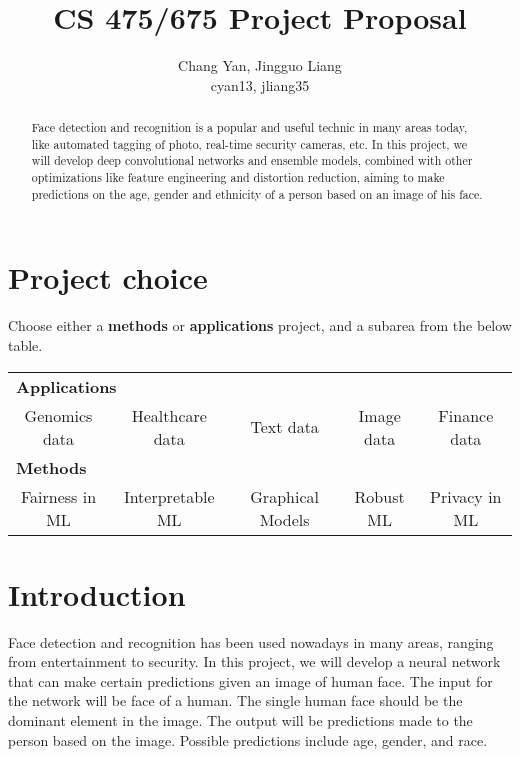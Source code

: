 \documentclass{article}
\title{CS 475/675 Project Proposal}
\author{
  Chang Yan, Jingguo Liang\\
  cyan13, jliang35
}
\newcommand{\Checked}{{\LARGE \XBox}}%
\newcommand{\Unchecked}{{\LARGE \Square}}%
\begin{document}
\maketitle

\begin{abstract}
Face detection and recognition is a popular and useful technic in many areas today, like automated tagging of photo, real-time security cameras, etc. In this project, we will develop deep convolutional networks and ensemble models, combined with other optimizations like feature engineering and distortion reduction, aiming to make predictions on the age, gender and ethnicity of a person based on an image of his face. 
\end{abstract}

\section{Project choice}

Choose either a {\bf methods} or {\bf applications} project, and a subarea from the below table.
\begin{table}[!h]
\centering
\def\arraystretch{2}
\begin{tabular}{c c c c c }
\toprule
\multicolumn{5}{l}{\Checked \bf Applications} \\
\Unchecked Genomics data & 
\Unchecked Healthcare data & 
\Unchecked Text data &
\Checked Image data &
\Unchecked Finance data \\
\midrule
\multicolumn{5}{l}{\Unchecked \bf Methods} \\
\Unchecked Fairness in ML &
\Unchecked Interpretable ML &
\Unchecked Graphical Models &
\Unchecked Robust ML &
\Unchecked Privacy in ML \\
\bottomrule
\end{tabular}
\end{table}

\section{Introduction}	
Face detection and recognition has been used nowadays in many areas, ranging from entertainment to security. In this project, we will develop a neural network that can make certain predictions given an image of human face. The input for the network will be face of a human. The single human face should be the dominant element in the image. The output will be predictions made to the person based on the image. Possible predictions include age, gender, and race.
\end{document}
